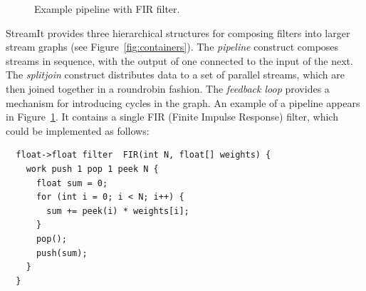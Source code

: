 \documentclass[11pt, letterpaper, onecolumn]{article}
\begin{document}
\begin{figure}[t]
\begin{center}
  \caption{Example pipeline with FIR filter.}
  \label{fig:pipeline}
\end{center}
\end{figure}

StreamIt provides three  hierarchical structures for composing filters
into larger stream graphs (see Figure~\ref{fig:containers}).  The {\it
pipeline} construct  composes streams in sequence, with  the output of
one connected to the input of the next.  The {\it splitjoin} construct
distributes data to  a set of parallel streams,  which are then joined
together in a roundrobin fashion.   The {\it feedback loop} provides a
mechanism  for introducing  cycles  in  the graph.   An  example of  a
pipeline  appears  in  Figure~\ref{fig:pipeline}.  It  contains  a
single  FIR   (Finite  Impulse   Response)  filter,  which   could  be
implemented as follows:
\begin{singlespace}
\begin{verbatim}
  float->float filter  FIR(int N, float[] weights) {
    work push 1 pop 1 peek N {
      float sum = 0;
      for (int i = 0; i < N; i++) {
        sum += peek(i) * weights[i];
      }
      pop();
      push(sum);
    }
  }
\end{verbatim}
\end{singlespace}
\end{document}
